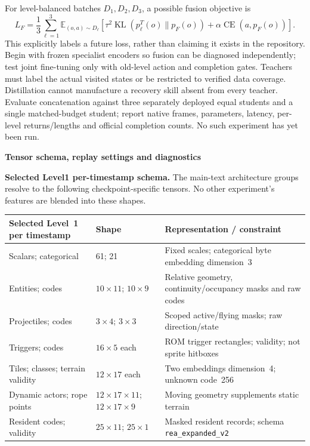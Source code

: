 \documentclass[11pt,a4paper]{article}
\newcommand{\topic}[2]{\vspace*{-4mm}{\small\color{teal}\textbf{#1}}\par{\LARGE\bfseries #2}\par\vspace{3mm}}
\begin{document}
For level-balanced batches $D_1,D_2,D_3$, a possible fusion objective is
\begin{equation}
 L_F=\frac13\sum_{\ell=1}^3\mathbb E_{(o,a)\sim D_\ell}
 \left[\tau^2\operatorname{KL}(p^T_\ell(o)\|p_F(o))+\alpha\operatorname{CE}(a,p_F(o))\right].
\end{equation}
This explicitly labels a future loss, rather than claiming it exists in the repository. Begin with frozen specialist encoders so fusion can be diagnosed independently; test joint fine-tuning only with old-level action and completion gates. Teachers must label the actual visited states or be restricted to verified data coverage. Distillation cannot manufacture a recovery skill absent from every teacher. Evaluate concatenation against three separately deployed equal students and a single matched-budget student; report native frames, parameters, latency, per-level returns/lengths and official completion counts. No such experiment has yet been run.




\clearpage
\topic{APPENDIX F / IMPLEMENTATION DETAILS}{Tensor schema, replay settings and diagnostics}
\small
\textbf{Selected Level1 per-timestamp schema.} The main-text architecture groups resolve to the following checkpoint-specific tensors. No other experiment's features are blended into these shapes.

\begin{tabularx}{\linewidth}{@{}P{39mm}P{29mm}Y@{}}\toprule
Selected Level~1 per timestamp & Shape & Representation / constraint\\\midrule
Scalars; categorical & 61; 21 & Fixed scales; categorical byte embedding dimension~3\\
Entities; codes & $10\!\times\!11$; $10\!\times\!9$ & Relative geometry, continuity/occupancy masks and raw codes\\
Projectiles; codes & $3\!\times\!4$; $3\!\times\!3$ & Scoped active/flying masks; raw direction/state\\
Triggers; codes & $16\!\times\!5$ each & ROM trigger rectangles; validity; not sprite hitboxes\\
Tiles; classes; terrain validity & $12\!\times\!17$ each & Two embeddings dimension~4; unknown code~256\\
Dynamic actors; rope points & $12\!\times\!17\!\times\!11$; $12\!\times\!17\!\times\!9$ & Moving geometry supplements static terrain\\
Resident codes; validity & $25\!\times\!11$; $25\!\times\!1$ & Masked resident records; schema \texttt{rea\_expanded\_v2}\\\bottomrule
\end{tabularx}
\end{document}
